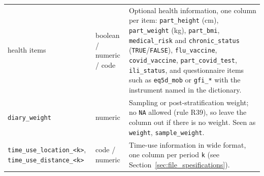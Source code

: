 \documentclass[11pt,a4paper]{article}
\begin{document}
{\begin{longtable}{p{3.4cm} p{1.8cm} p{8.2cm}}
    health items & boolean / numeric / code & Optional health information, one column per item: \texttt{part\_\allowbreak{}height} (cm), \texttt{part\_\allowbreak{}weight} (kg), \texttt{part\_\allowbreak{}bmi}, \texttt{medical\_\allowbreak{}risk} and \texttt{chronic\_\allowbreak{}status} (\texttt{TRUE}/\texttt{FALSE}), \texttt{flu\_\allowbreak{}vaccine}, \texttt{covid\_\allowbreak{}vaccine}, \texttt{part\_\allowbreak{}covid\_\allowbreak{}test}, \texttt{ili\_\allowbreak{}status}, and questionnaire items such as \texttt{eq5d\_\allowbreak{}mob} or \texttt{gfi\_\allowbreak{}*} with the instrument named in the dictionary. \\
    \texttt{diary\_\allowbreak{}weight} & numeric & Sampling or post-stratification weight; no \texttt{NA} allowed (rule R39), so leave the column out if there is no weight. Seen as \texttt{weight}, \texttt{sample\_\allowbreak{}weight}. \\
    \texttt{time\_\allowbreak{}use\_\allowbreak{}location\_\allowbreak{}<k>}, \texttt{time\_\allowbreak{}use\_\allowbreak{}distance\_\allowbreak{}<k>} & code / numeric & Time-use information in wide format, one column per period \texttt{k} (see Section~\ref{sec:file_spesifications}). \\
\end{longtable}
}
\end{document}
